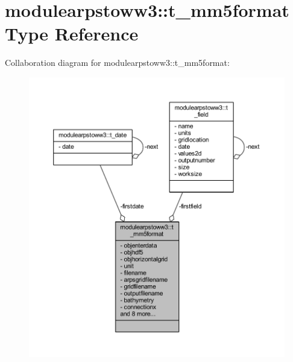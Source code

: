 \hypertarget{structmodulearpstoww3_1_1t__mm5format}{}\section{modulearpstoww3\+:\+:t\+\_\+mm5format Type Reference}
\label{structmodulearpstoww3_1_1t__mm5format}


Collaboration diagram for modulearpstoww3\+:\+:t\+\_\+mm5format\+:\nopagebreak
\begin{figure}[H]
\begin{center}
\leavevmode
\includegraphics[width=350pt]{structmodulearpstoww3_1_1t__mm5format__coll__graph}
\end{center}
\end{figure}
